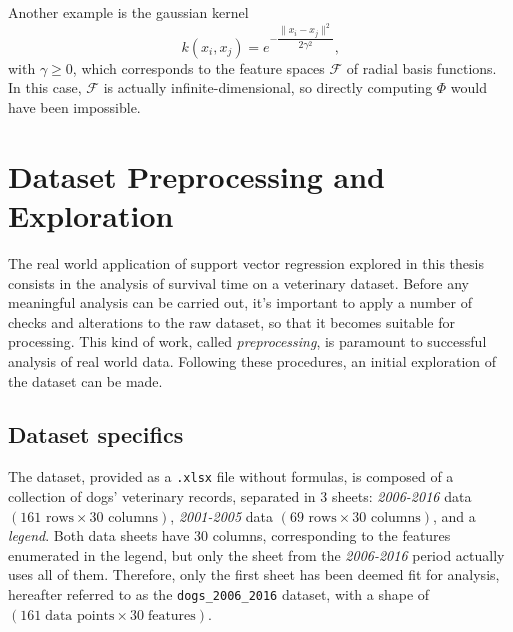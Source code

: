\documentclass[12pt]{report}
\begin{document}
Another example is the gaussian kernel
\begin{equation} \label{gausskernel}
k(x_{i},x_{j}) = e^{-\dfrac{\| x_{i}-x_{j} \|^{2}}{2\gamma^{2}}} \text{,}
\end{equation}
with $ \gamma \geq 0 $, which corresponds to the feature spaces $ \mathcal{F} $ of radial basis functions. In this case, $ \mathcal{F} $ is actually infinite-dimensional, so directly computing $ \Phi $ would have been impossible.

\chapter{Dataset Preprocessing and Exploration}
\label{chprepr}
The real world application of support vector regression explored in this thesis consists in the analysis of survival time on a veterinary dataset. Before any meaningful analysis can be carried out, it's important to apply a number of checks and alterations to the raw dataset, so that it becomes suitable for processing. This kind of work, called \textit{preprocessing}, is paramount to successful analysis of real world data. Following these procedures, an initial exploration of the dataset can be made.

\section{Dataset specifics}
The dataset, provided as a \texttt{.xlsx} file without formulas, is composed of a collection of dogs' veterinary records, separated in 3 sheets: \textit{2006-2016} data $ (161 \text{ rows} \times 30 \text{ columns}) $, \textit{2001-2005} data $ (69 \text{ rows} \times 30 \text{ columns}) $, and a \textit{legend}. Both data sheets have 30 columns, corresponding to the features enumerated in the legend, but only the sheet from the \textit{2006-2016} period actually uses all of them. Therefore, only the first sheet has been deemed fit for analysis, hereafter referred to as the \texttt{dogs\_2006\_2016} dataset, with a shape of $ (161\; \text{data points} \times 30\; \text{features}) $.
\end{document}
